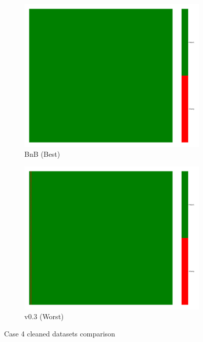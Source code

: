 \documentclass[a4paper,12pt]{article}
\begin{document}
\begin{figure}[H]
    \centering
    \begin{subfigure}{0.45\textwidth}
        \includegraphics[width=\linewidth]{case4_bnb_heatmap_cleaned.png}
        \caption{BnB (Best)}
    \end{subfigure}
    \hfill
    \begin{subfigure}{0.45\textwidth}
        \includegraphics[width=\linewidth]{case4_v0.3_heatmap_cleaned.png}
        \caption{v0.3 (Worst)}
    \end{subfigure}
    \caption{Case 4 cleaned datasets comparison}
\end{figure}
\end{document}

